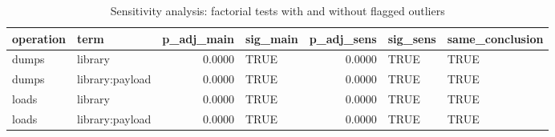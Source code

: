 \begin{table}[ht]
\centering
\begin{tabular}{llrlrll}
  \toprule
operation & term & p\_adj\_main & sig\_main & p\_adj\_sens & sig\_sens & same\_conclusion \\ 
  \midrule
dumps & library & 0.0000 & TRUE & 0.0000 & TRUE & TRUE \\ 
  dumps & library:payload & 0.0000 & TRUE & 0.0000 & TRUE & TRUE \\ 
  loads & library & 0.0000 & TRUE & 0.0000 & TRUE & TRUE \\ 
  loads & library:payload & 0.0000 & TRUE & 0.0000 & TRUE & TRUE \\ 
   \bottomrule
\end{tabular}
\caption{Sensitivity analysis: factorial tests with and without flagged outliers} 
\label{tab:sens_anova}
\end{table}
